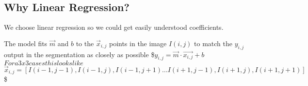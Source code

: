 \documentclass[letterpaper,10pt,english]{sphinxmanual}
\begin{document}
\begin{sphinxVerbatim}[commandchars=\\\{\}]
   

\PYG{p}{[}  \PYG{p}{]}    
\end{sphinxVerbatim}

\noindent{}


\subsection{Why Linear Regression?}
\label{\detokenize{05-SupervisedSegmentation:why-linear-regression}}
\sphinxAtStartPar
We choose linear regression so we could get easily understood coefficients.

\sphinxAtStartPar
The model fits \(\vec{m}\) and \(b\) to the \(\vec{x}_{i,j}\) points in the image \(I(i,j)\) to match the \(y_{i,j}\) output in the segmentation as closely as possible
\$\( y_{i,j} = \vec{m}\cdot\vec{x_{i,j}}+b \)\(
For a 3x3 cases this looks like
\)\( \vec{x}_{i,j} = \left[I(i-1,j-1), I(i-1, j), I(i-1, j+1) \dots I(i+1,j-1), I(i+1, j), I(i+1, j+1)\right] \)\$
\end{document}
